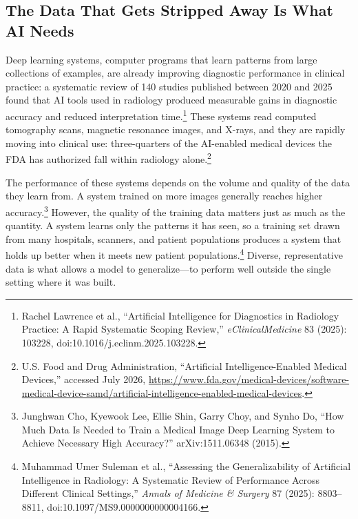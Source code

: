 \documentclass[11pt]{article}
\begin{document}
\subsection{The Data That Gets Stripped Away Is What AI Needs}\label{sec:diverse-data}

Deep learning systems, computer programs that learn patterns from large collections of examples, are already improving diagnostic performance in clinical practice: a systematic review of 140 studies published between 2020 and 2025 found that AI tools used in radiology produced measurable gains in diagnostic accuracy and reduced interpretation time.\footnote{Rachel Lawrence et al., ``Artificial Intelligence for Diagnostics in Radiology Practice: A Rapid Systematic Scoping Review,'' \textit{eClinicalMedicine} 83 (2025): 103228, doi:10.1016/j.eclinm.2025.103228.} These systems read computed tomography scans, magnetic resonance images, and X-rays, and they are rapidly moving into clinical use: three-quarters of the AI-enabled medical devices the FDA has authorized fall within radiology alone.\footnote{U.S. Food and Drug Administration, ``Artificial Intelligence-Enabled Medical Devices,'' accessed July 2026, \url{https://www.fda.gov/medical-devices/software-medical-device-samd/artificial-intelligence-enabled-medical-devices}.}


The performance of these systems depends on the volume and quality of the data they learn from. A system trained on more images generally reaches higher accuracy.\footnote{Junghwan Cho, Kyewook Lee, Ellie Shin, Garry Choy, and Synho Do, ``How Much Data Is Needed to Train a Medical Image Deep Learning System to Achieve Necessary High Accuracy?'' arXiv:1511.06348 (2015).} However, the quality of the training data matters just as much as the quantity. A system learns only the patterns it has seen, so a training set drawn from many hospitals, scanners, and patient populations produces a system that holds up better when it meets new patient populations.\footnote{Muhammad Umer Suleman et al., ``Assessing the Generalizability of Artificial Intelligence in Radiology: A Systematic Review of Performance Across Different Clinical Settings,'' \textit{Annals of Medicine \& Surgery} 87 (2025): 8803--8811, doi:10.1097/MS9.0000000000004166.} Diverse, representative data is what allows a model to generalize---to perform well outside the single setting where it was built.
\end{document}
